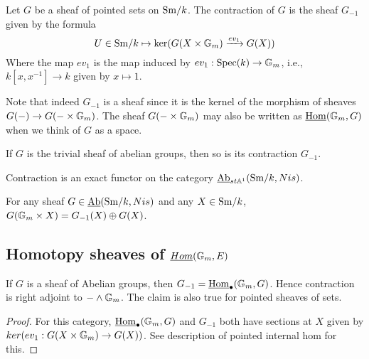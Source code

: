 \documentclass{amsart}%
\begin{document}
\begin{definition}
  Let $G$ be a sheaf of pointed sets on $\mathrm{Sm}/k$. The contraction of
  $G$ is the sheaf $G_{-1}$ given by the formula
  \begin{equation*}
    U \in \mathrm{Sm}/k \mapsto \ker( G(X\times \mathbb{G}_m) \xrightarrow{ev_1} G(X))
  \end{equation*}
  Where the map $ev_1$ is the map induced by
  $ev_1 : \operatorname{Spec}(k) \to \mathbb{G}_m$, i.e., $k[x,x^{-1}] \to k$ given by
  $x\mapsto 1$.

  Note that indeed $G_{-1}$ is a sheaf since it is the kernel of the
  morphism of sheaves $G(-) \to G(-\times \mathbb{G}_m)$. The sheaf
  $G(-\times \mathbb{G}_m)$ may also be written as
  $\underline{\operatorname{Hom}}(\mathbb{G}_m, G)$ when we think of $G$ as a
  space.
\end{definition}

\begin{proposition}
  If $G$ is the trivial sheaf of abelian groups, then so is its
  contraction $G_{-1}$.
\end{proposition}

\begin{proposition}
  Contraction is an exact functor on the category
  $\operatorname{\underline{Ab}}_{st\mathbb{A}^1}(\mathrm{Sm}/k,Nis)$.

  For any sheaf $G \in \operatorname{\underline{Ab}}(\mathrm{Sm}/k,Nis)$ and any $X \in \mathrm{Sm}/k$,
  $G(\mathbb{G}_m\times X) = G_{-1}(X) \oplus G(X)$.
\end{proposition}


\subsection{Homotopy sheaves of $\underline{Hom}(\mathbb{G}_m, E)$}

\begin{proposition}
  If $G$ is a sheaf of Abelian groups, then
  $G_{-1} = \underline{\operatorname{Hom}}_{\bullet}(\mathbb{G}_m, G)$.  Hence contraction
  is right adjoint to $- \wedge \mathbb{G}_m$. The claim is also true for
  pointed sheaves of sets.
\end{proposition}

\begin{proof}
  For this category, $\underline{\operatorname{Hom}}_{\bullet}(\mathbb{G}_m, G)$ and
  $G_{-1}$ both have sections at $X$ given by
  $ker( ev_1 : G(X \times \mathbb{G}_m) \to G(X))$. See description of
  pointed internal hom for this. 
\end{proof}
\end{document}
